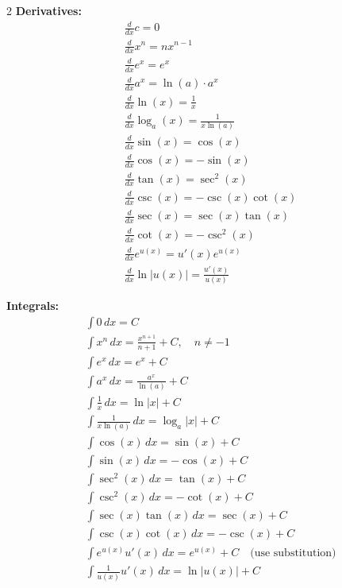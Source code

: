 \begin{multicols}{2}
\noindent
\textbf{Derivatives:}
\begin{align*}
&\frac{d}{dx}c = 0 \\
&\frac{d}{dx}x^n = nx^{n-1} \\
&\frac{d}{dx}e^x = e^x \\
&\frac{d}{dx}a^x = \ln(a) \cdot a^x \\
&\frac{d}{dx}\ln(x) = \frac{1}{x} \\
&\frac{d}{dx}\log_a(x) = \frac{1}{x \ln(a)} \\
&\frac{d}{dx}\sin(x) = \cos(x) \\
&\frac{d}{dx}\cos(x) = -\sin(x) \\
&\frac{d}{dx}\tan(x) = \sec^2(x) \\
&\frac{d}{dx}\csc(x) = -\csc(x)\cot(x) \\
&\frac{d}{dx}\sec(x) = \sec(x)\tan(x) \\
&\frac{d}{dx}\cot(x) = -\csc^2(x) \\
&\frac{d}{dx}e^{u(x)} = u'(x)e^{u(x)} \\
&\frac{d}{dx}\ln|u(x)| = \frac{u'(x)}{u(x)}
\end{align*}

\columnbreak

\noindent
\textbf{Integrals:}
\begin{align*}
&\int 0\,dx = C \\
&\int x^n\,dx = \frac{x^{n+1}}{n+1} + C, \quad n \neq -1 \\
&\int e^x\,dx = e^x + C \\
&\int a^x\,dx = \frac{a^x}{\ln(a)} + C \\
&\int \frac{1}{x}\,dx = \ln|x| + C \\
&\int \frac{1}{x \ln(a)}\,dx = \log_a|x| + C \\
&\int \cos(x)\,dx = \sin(x) + C \\
&\int \sin(x)\,dx = -\cos(x) + C \\
&\int \sec^2(x)\,dx = \tan(x) + C \\
&\int \csc^2(x)\,dx = -\cot(x) + C \\
&\int \sec(x)\tan(x)\,dx = \sec(x) + C \\
&\int \csc(x)\cot(x)\,dx = -\csc(x) + C \\
&\int e^{u(x)}u'(x)\,dx = e^{u(x)} + C\quad \text{(use substitution)} \\
&\int \frac{1}{u(x)}u'(x)\,dx = \ln|u(x)| + C
\end{align*}
\end{multicols}

